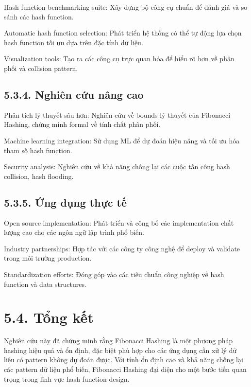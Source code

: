 \documentclass[12pt,a4paper]{report}
\begin{document}
\noindent \indent Hash function benchmarking suite: Xây dựng bộ công cụ chuẩn để đánh giá và so sánh các hash function.

Automatic hash function selection: Phát triển hệ thống có thể tự động lựa chọn hash function tối ưu dựa trên đặc tính dữ liệu.

Visualization tools: Tạo ra các công cụ trực quan hóa để hiểu rõ hơn về phân phối và collision pattern.

\subsection*{5.3.4. Nghiên cứu nâng cao}

\noindent \indent Phân tích lý thuyết sâu hơn: Nghiên cứu về bounds lý thuyết của Fibonacci Hashing, chứng minh formal về tính chất phân phối.

Machine learning integration: Sử dụng ML để dự đoán hiệu năng và tối ưu hóa tham số hash function.

Security analysis: Nghiên cứu về khả năng chống lại các cuộc tấn công hash collision, hash flooding.

\subsection*{5.3.5. Ứng dụng thực tế}

\noindent \indent Open source implementation: Phát triển và công bố các implementation chất lượng cao cho các ngôn ngữ lập trình phổ biến.

Industry partnerships: Hợp tác với các công ty công nghệ để deploy và validate trong môi trường production.

Standardization efforts: Đóng góp vào các tiêu chuẩn công nghiệp về hash function và data structures.
\section*{5.4. Tổng kết}
\noindent \indent Nghiên cứu này đã chứng minh rằng Fibonacci Hashing là một phương pháp hashing hiệu quả và ổn định, đặc biệt phù hợp cho các ứng dụng cần xử lý dữ liệu có pattern không dự đoán được. Với tính ổn định cao và khả năng chống lại các pattern dữ liệu phổ biến, Fibonacci Hashing đại diện cho một bước tiến quan trọng trong lĩnh vực hash function design.
\end{document}
